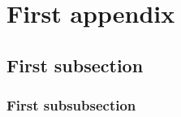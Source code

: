 \section{First appendix}
\lipsum[11-12]
\subsection{First subsection}
\subsubsection{First subsubsection}
\lipsum[23]
